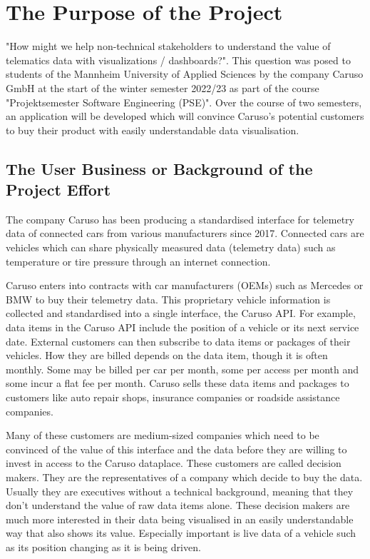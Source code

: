 \chapter{The Purpose of the Project}
"How might we help non-technical stakeholders to understand the value of telematics data with visualizations / dashboards?". This question was posed to students of the Mannheim University of Applied Sciences by the company Caruso GmbH at the start of the winter semester 2022/23 as part of the course "Projektsemester Software Engineering (PSE)". Over the course of two semesters, an application will be developed which will convince Caruso's potential customers to buy their product with easily understandable data visualisation.

\section{The User Business or Background of the Project Effort}
The company Caruso has been producing a standardised interface for telemetry data of connected cars from various manufacturers since 2017. Connected cars are vehicles which can share physically measured data (telemetry data) such as temperature or tire pressure through an internet connection.

Caruso enters into contracts with car manufacturers (OEMs) such as Mercedes or BMW to buy their telemetry data. This proprietary vehicle information is collected and standardised into a single interface, the Caruso API. For example, data items in the Caruso API include the position of a vehicle or its next service date. External customers can then subscribe to data items or packages of their vehicles. How they are billed depends on the data item, though it is often monthly. Some may be billed per car per month, some per access per month and some incur a flat fee per month. Caruso sells these data items and packages to customers like auto repair shops, insurance companies or roadside assistance companies. 

Many of these customers are medium-sized companies which need to be convinced of the value of this interface and the data before they are willing to invest in access to the Caruso dataplace. These customers are called decision makers. They are the representatives of a company which decide to buy the data. Usually they are executives without a technical background, meaning that they don't understand the value of raw data items alone. These decision makers are much more interested in their data being visualised in an easily understandable way that also shows its value. Especially important is live data of a vehicle such as its position changing as it is being driven.

